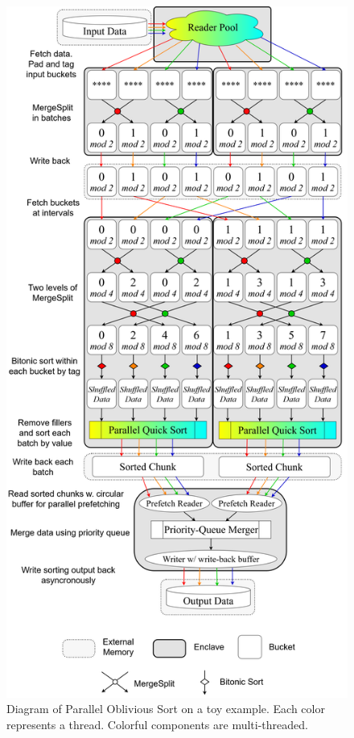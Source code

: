 \documentclass[final,hyperref={pdfpagelabels=false}]{beamer}
\begin{document}
\begin{frame}
\begin{columns}[t]
  \begin{column}{.30\linewidth}
    \begin{figure}
      \includegraphics[width=\linewidth]{assets/parosort.png}
      \caption{Diagram of Parallel Oblivious Sort on a toy example. Each color represents a thread. Colorful components are multi-threaded.}
    \end{figure}
  \end{column}
  \end{columns}
\end{frame}
\end{document}
